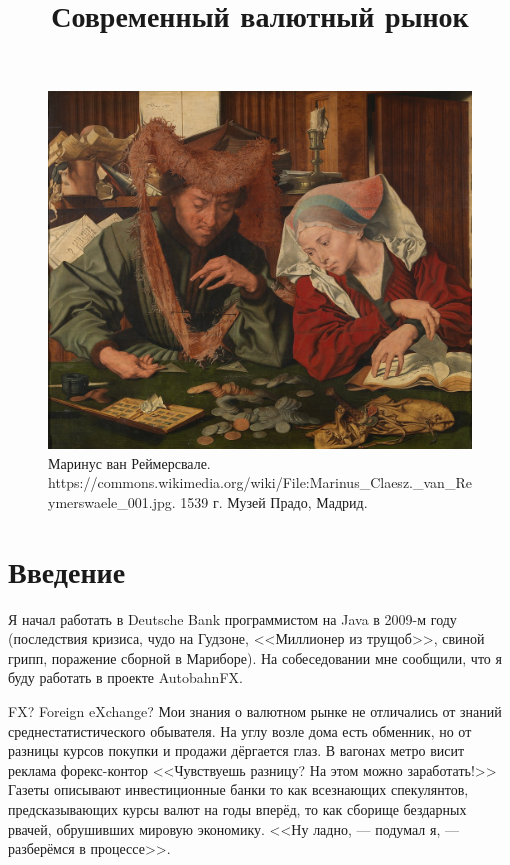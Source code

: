 
\title{Современный валютный рынок}



\maketitle
\thispagestyle{empty}

\begin{figure}[h]
\centering
\includegraphics[width=\textwidth]{moneychanger_and_his_wife.jpg}
\captionsetup{labelformat=empty}
\caption{\small{
Маринус ван Реймерсвале. 
{https://commons.wikimedia.org/wiki/File:Marinus_Claesz._van_Reymerswaele_001.jpg}.
1539 г. Музей Прадо, Мадрид.
}}
\end{figure}
\newpage

\section*{Введение}

Я начал работать в Deutsche Bank программистом на Java в 2009-м году
(последствия кризиса, чудо на Гудзоне, <<Миллионер из трущоб>>, свиной грипп,
поражение сборной в Мариборе). На собеседовании мне сообщили, что я буду
работать в проекте AutobahnFX.

FX? Foreign eXchange? Мои знания о валютном рынке не отличались от знаний
среднестатистического обывателя. На углу возле дома есть обменник, но от разницы
курсов покупки и продажи дёргается глаз. В вагонах метро висит реклама
форекс-контор <<Чувствуешь разницу? На этом можно заработать!>> Газеты описывают
инвестиционные банки то как всезнающих спекулянтов, предсказывающих курсы валют
на годы вперёд, то как сборище бездарных рвачей, обрушивших мировую экономику.
<<Ну ладно, --- подумал я, --- разберёмся в процессе>>.

